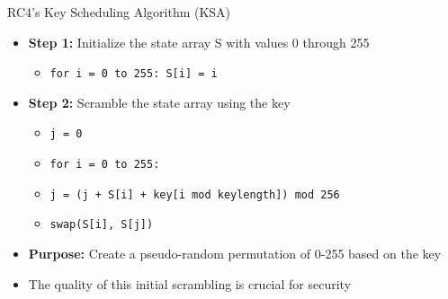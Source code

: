 \documentclass[aspectratio=169, lualatex, handout]{beamer}
\begin{document}
\begin{frame}{RC4's Key Scheduling Algorithm (KSA)}
	\begin{itemize}[<+->]
		\item \textbf{Step 1:} Initialize the state array S with values 0 through 255
		      \begin{itemize}[<+->]
			      \item \texttt{for i = 0 to 255: S[i] = i}
		      \end{itemize}
		\item \textbf{Step 2:} Scramble the state array using the key
		      \begin{itemize}[<+->]
			      \item \texttt{j = 0}
			      \item \texttt{for i = 0 to 255:}
			      \item \texttt{\quad j = (j + S[i] + key[i mod keylength]) mod 256}
			      \item \texttt{\quad swap(S[i], S[j])}
		      \end{itemize}
		\item \textbf{Purpose:} Create a pseudo-random permutation of 0-255 based on the key
		\item The quality of this initial scrambling is crucial for security
	\end{itemize}
\end{frame}
\end{document}
